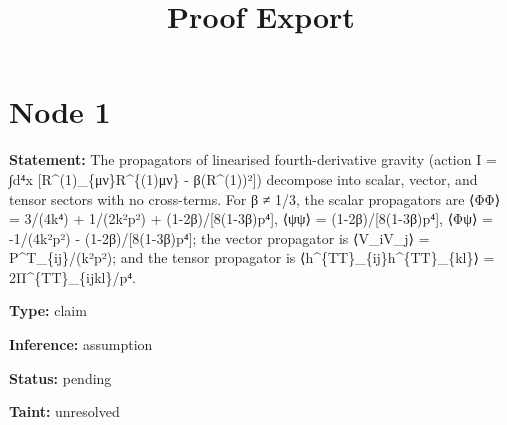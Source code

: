 \documentclass{article}
\title{Proof Export}
\date{}
\begin{document}
\maketitle

\section*{Node 1}

\textbf{Statement:} The propagators of linearised fourth-derivative gravity (action I = ∫d⁴x [R\textasciicircum{}(1)\_\{μν\}R\textasciicircum{}\{(1)μν\} - β(R\textasciicircum{}(1))²]) decompose into scalar, vector, and tensor sectors with no cross-terms. For β ≠ 1/3, the scalar propagators are ⟨ΦΦ⟩ = 3/(4k⁴) + 1/(2k²p²) + (1-2β)/[8(1-3β)p⁴], ⟨ψψ⟩ = (1-2β)/[8(1-3β)p⁴], ⟨Φψ⟩ = -1/(4k²p²) - (1-2β)/[8(1-3β)p⁴]; the vector propagator is ⟨V\_iV\_j⟩ = P\textasciicircum{}T\_\{ij\}/(k²p²); and the tensor propagator is ⟨h\textasciicircum{}\{TT\}\_\{ij\}h\textasciicircum{}\{TT\}\_\{kl\}⟩ = 2Π\textasciicircum{}\{TT\}\_\{ijkl\}/p⁴.

\textbf{Type:} claim

\textbf{Inference:} assumption

\textbf{Status:} pending

\textbf{Taint:} unresolved
\end{document}
